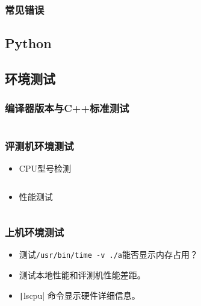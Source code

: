\documentclass[a4paper, twoside]{article}
\begin{document}
    \subsubsection{常见错误}

\subsection{Python}

\subsection{环境测试}
    \subsubsection{编译器版本与C++标准测试}
    \inputminted{cpp}{../src/附录/环境测试/编译器版本与C++标准测试.cpp}

    \subsubsection{评测机环境测试}
    \begin{itemize}
        \item CPU型号检测
        \inputminted{cpp}{../src/附录/环境测试/CPU型号检测.cpp}
        \item 性能测试
        \inputminted{cpp}{../src/附录/环境测试/性能测试.cpp}
    \end{itemize}

    \subsubsection{上机环境测试}
    \begin{itemize}
        \item 测试\texttt{/usr/bin/time -v ./a}能否显示内存占用？
        \item 测试本地性能和评测机性能差距。
        \item \texttt|lscpu| 命令显示硬件详细信息。
    \end{itemize}
\end{document}
